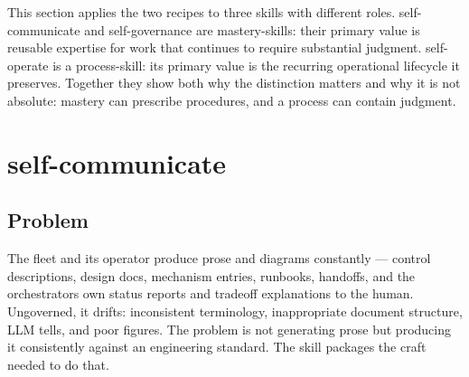 

This section applies the two recipes to three skills with different roles. self-communicate and self-governance are mastery-skills: their primary value is reusable expertise for work that continues to require substantial judgment. self-operate is a process-skill: its primary value is the recurring operational lifecycle it preserves. Together they show both why the distinction matters and why it is not absolute: mastery can prescribe procedures, and a process can contain judgment.

\section{self-communicate}\label{heading:self-communicate}

\subsection{Problem}\label{heading:problem}

The fleet and its operator produce prose and diagrams constantly --- control descriptions, design docs, mechanism entries, runbooks, handoffs, and the orchestrator\textquotesingle s own status reports and tradeoff explanations to the human. Ungoverned, it drifts: inconsistent terminology, inappropriate document structure, LLM tells, and poor figures. The problem is not generating prose but producing it consistently against an engineering standard. The skill packages the craft needed to do that.

